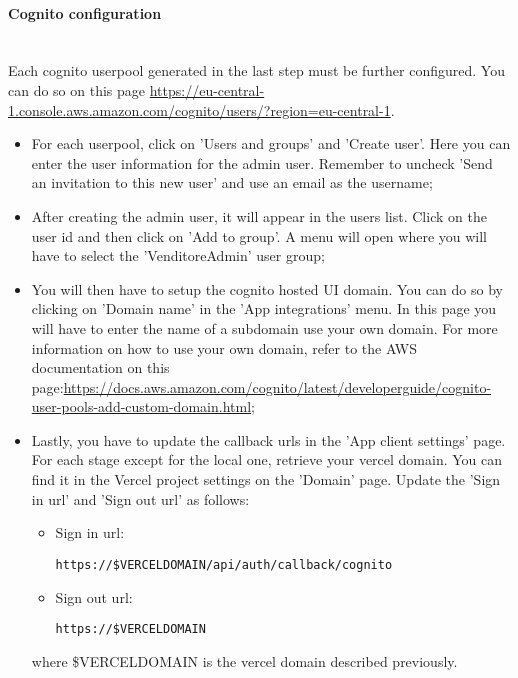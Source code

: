 \paragraph{Cognito configuration}\mbox{}\\
Each cognito userpool generated in the last step must be further configured. You can do so on this page \url{https://eu-central-1.console.aws.amazon.com/cognito/users/?region=eu-central-1}.
\begin{itemize}

\item For each userpool, click on 'Users and groups' and 'Create user'. Here you can enter the user information for the admin user. Remember to uncheck 'Send an invitation to this new user' and use an email as the username;

\item After creating the admin user, it will appear in the users list. Click on the user id and then click on 'Add to group'. A menu will open where you will have to select  the 'VenditoreAdmin' user group;

\item You will then have to setup the cognito hosted UI domain. You can do so by clicking on 'Domain name' in the 'App integrations' menu. In this page you will have to enter the name of a subdomain use your own domain. For more information on how to use your own domain, refer to the AWS documentation on this page:\url{https://docs.aws.amazon.com/cognito/latest/developerguide/cognito-user-pools-add-custom-domain.html};

\item Lastly, you have to update the callback urls in the 'App client settings' page. For each stage except for the local one, retrieve your vercel domain. You can find it in the Vercel project settings on the 'Domain' page. Update the 'Sign in url' and 'Sign out url' as follows:
\begin{itemize}
\item Sign in url:
\begin{center}
\texttt{https://\$VERCELDOMAIN/api/auth/callback/cognito}
\end{center}
\item Sign out url:
\begin{center}
\texttt{https://\$VERCELDOMAIN}
\end{center}
\end{itemize}
where \$VERCELDOMAIN is the vercel domain described previously.
\end{itemize}

